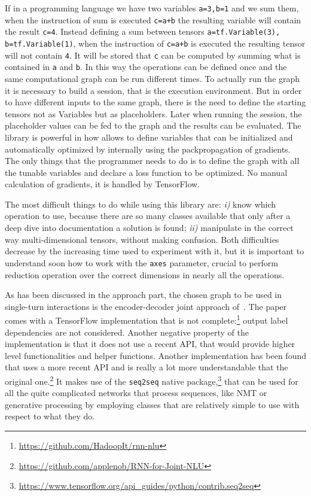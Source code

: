 If in a programming language we have two variables  \texttt{a=3,b=1} and we sum them, when the instruction of sum is executed \texttt{c=a+b} the resulting variable will contain the result \texttt{c=4}. Instead defining a sum between tensors \texttt{a=tf.Variable(3), b=tf.Variable(1)}, when the instruction of \texttt{c=a+b} is executed the resulting tensor will not contain \texttt{4}. It will be stored that \texttt{c} can be computed by summing what is contained in \texttt{a} and \texttt{b}. In this way the operations can be defined once and the same computational graph can be run different times. To actually run the graph it is necessary to build a session, that is the execution environment. But in order to have different inputs to the same graph, there is the need to define the starting tensors not as Variables but as placeholders. Later when running the session, the placeholder values can be fed to the graph and the results can be evaluated. The library is powerful in how allows to define variables that can be initialized and automatically optimized by internally using the packpropagation of gradients. The only things that the programmer needs to do is to define the graph with all the tunable variables and declare a loss function to be optimized. No manual calculation of gradients, it is handled by TensorFlow.

The most difficult things to do while using this library are: \textit{i)} know which operation to use, because there are so many classes available that only after a deep dive into documentation a solution is found; \textit{ii)} manipulate in the correct way multi-dimensional tensors, without making confusion. Both difficulties decrease by the increasing time used to experiment with it, but it is important to understand soon how to work with the \texttt{axes} parameter, crucial to perform reduction operation over the correct dimensions in nearly all the operations.

As has been discussed in the approach part, the chosen graph to be used in single-turn interactions is the encoder-decoder joint approach of~\cite{liu2016attention}. The paper comes with a TensorFlow implementation that is not complete:\footnote{\url{https://github.com/HadoopIt/rnn-nlu}} output label dependencies are not considered. Another negative property of the implementation is that it does not use a recent API, that would provide higher level functionalities and helper functions. Another implementation has been found that uses a more recent API and is really a lot more understandable that the original one.\footnote{\url{https://github.com/applenob/RNN-for-Joint-NLU}} It makes use of the \texttt{seq2seq} native package,\footnote{\url{https://www.tensorflow.org/api\_guides/python/contrib.seq2seq}} that can be used for all the quite complicated networks that process sequences, like NMT or generative processing by employing classes that are relatively simple to use with respect to what they do.

